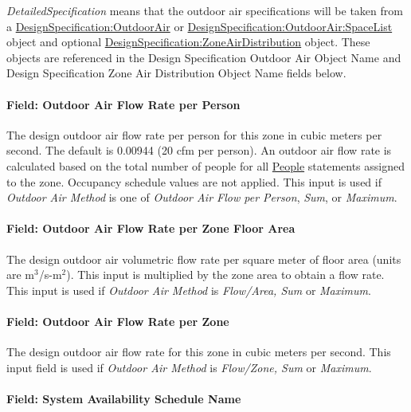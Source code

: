 \emph{DetailedSpecification} means that the outdoor air specifications will be taken from a \hyperref[designspecificationoutdoorair]{DesignSpecification:OutdoorAir} or \hyperref[designspecificationoutdoorairspacelist]{DesignSpecification:OutdoorAir:SpaceList} object and optional \hyperref[designspecificationzoneairdistribution]{DesignSpecification:ZoneAirDistribution} object. These objects are referenced in the Design Specification Outdoor Air Object Name and Design Specification Zone Air Distribution Object Name fields below.

\paragraph{Field: Outdoor Air Flow Rate per Person}\label{field-outdoor-air-flow-rate-per-person-5}

The design outdoor air flow rate per person for this zone in cubic meters per second. The default is 0.00944 (20 cfm per person). An outdoor air flow rate is calculated based on the total number of people for all \hyperref[people]{People} statements assigned to the zone. Occupancy schedule values are not applied. This input is used if \emph{Outdoor Air Method} is one of \emph{Outdoor Air Flow per Person}, \emph{Sum}, or \emph{Maximum}.

\paragraph{Field: Outdoor Air Flow Rate per Zone Floor Area}\label{field-outdoor-air-flow-rate-per-zone-floor-area-5}

The design outdoor air volumetric flow rate per square meter of floor area (units are m\(^{3}\)/s-m\(^{2}\)). This input is multiplied by the zone area to obtain a flow rate. This input is used if \emph{Outdoor Air Method} is \emph{Flow/Area, Sum} or \emph{Maximum}.

\paragraph{Field: Outdoor Air Flow Rate per Zone}\label{field-outdoor-air-flow-rate-per-zone-5}

The design outdoor air flow rate for this zone in cubic meters per second. This input field is used if \emph{Outdoor Air Method} is \emph{Flow/Zone, Sum} or \emph{Maximum}.

\paragraph{Field: System Availability Schedule Name}\label{field-system-availability-schedule-name-4}

